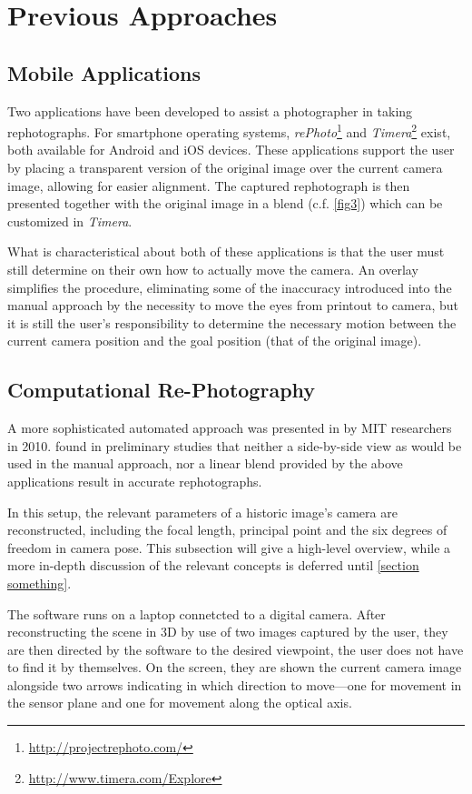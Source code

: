 \section{Previous Approaches}

\subsection{Mobile Applications}

Two applications have been developed to assist a photographer in taking
rephotographs. For smartphone operating systems,
\emph{rePhoto}\footnote{\url{http://projectrephoto.com/}} and
\emph{Timera}\footnote{\url{http://www.timera.com/Explore}} exist, both
available for Android and iOS devices. These applications support the user by placing a transparent
version of the original image over the current camera image, allowing for easier
alignment. The captured rephotograph is then presented together with the
original image in a blend (c.f. \autoref{fig3}) which can be customized in
\emph{Timera}.

What is characteristical about both of these applications is that the user must still
determine on their own how to actually move the camera. An overlay simplifies
the procedure, eliminating some of the inaccuracy introduced into the manual approach by the
necessity to move the eyes from printout to camera, but it is still the user's
responsibility to determine the necessary motion between the current camera
position and the goal position (that of the original image). 


\subsection{Computational Re-Photography}

A more
sophisticated automated approach was presented in by MIT researchers in
2010. \citet{bae2010} found in preliminary studies that neither a side-by-side
view as would be used in the manual approach, nor a linear blend provided by
the above applications result in accurate rephotographs.

In this setup, the relevant parameters of a historic image's camera are
reconstructed, including the focal length, principal point and the six degrees
of freedom in camera pose. This subsection will give a high-level overview,
while a more in-depth discussion of the relevant concepts is deferred until
\autoref{section something}.

The software runs on a laptop connetcted to a digital camera.  After
reconstructing the scene in 3D by use of two images captured by the user, they
are then directed by the software to the desired viewpoint, the user does not
have to find it by themselves.  On the screen, they
are shown the current camera image alongside two arrows indicating in which
direction to move---one for movement in the sensor plane and one for movement
along the optical axis.

